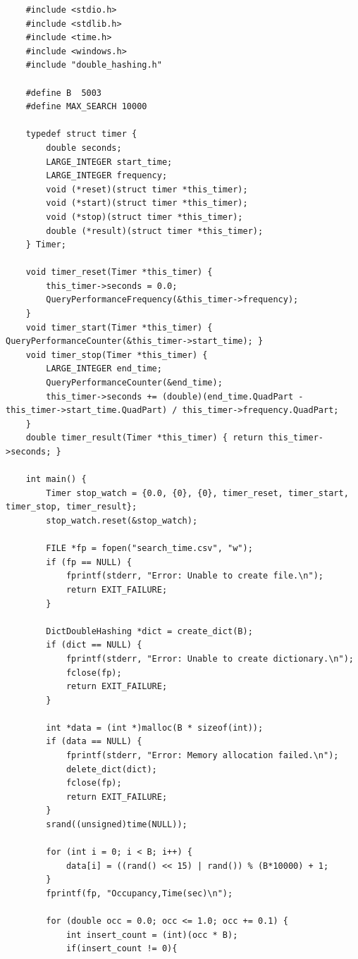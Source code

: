 \documentclass{ltjsarticle}
\begin{document}
\begin{lstlisting}
    #include <stdio.h>
    #include <stdlib.h>
    #include <time.h>
    #include <windows.h>
    #include "double_hashing.h"

    #define B  5003
    #define MAX_SEARCH 10000

    typedef struct timer {
        double seconds;
        LARGE_INTEGER start_time;
        LARGE_INTEGER frequency;
        void (*reset)(struct timer *this_timer);
        void (*start)(struct timer *this_timer);
        void (*stop)(struct timer *this_timer);
        double (*result)(struct timer *this_timer);
    } Timer;

    void timer_reset(Timer *this_timer) {
        this_timer->seconds = 0.0;
        QueryPerformanceFrequency(&this_timer->frequency);
    }
    void timer_start(Timer *this_timer) { QueryPerformanceCounter(&this_timer->start_time); }
    void timer_stop(Timer *this_timer) {
        LARGE_INTEGER end_time;
        QueryPerformanceCounter(&end_time);
        this_timer->seconds += (double)(end_time.QuadPart - this_timer->start_time.QuadPart) / this_timer->frequency.QuadPart;
    }
    double timer_result(Timer *this_timer) { return this_timer->seconds; }

    int main() {
        Timer stop_watch = {0.0, {0}, {0}, timer_reset, timer_start, timer_stop, timer_result};
        stop_watch.reset(&stop_watch);

        FILE *fp = fopen("search_time.csv", "w");
        if (fp == NULL) {
            fprintf(stderr, "Error: Unable to create file.\n");
            return EXIT_FAILURE;
        }

        DictDoubleHashing *dict = create_dict(B);
        if (dict == NULL) {
            fprintf(stderr, "Error: Unable to create dictionary.\n");
            fclose(fp);
            return EXIT_FAILURE;
        }

        int *data = (int *)malloc(B * sizeof(int));
        if (data == NULL) {
            fprintf(stderr, "Error: Memory allocation failed.\n");
            delete_dict(dict);
            fclose(fp);
            return EXIT_FAILURE;
        }
        srand((unsigned)time(NULL));

        for (int i = 0; i < B; i++) {
            data[i] = ((rand() << 15) | rand()) % (B*10000) + 1; 
        }
        fprintf(fp, "Occupancy,Time(sec)\n");

        for (double occ = 0.0; occ <= 1.0; occ += 0.1) {
            int insert_count = (int)(occ * B);
            if(insert_count != 0){
                

\end{lstlisting}
\end{document}
